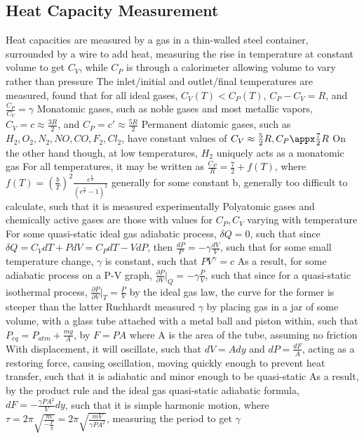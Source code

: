 \documentclass[11 pt, twoside]{article}
\newenvironment{outline*}
{
	\begin{outline}[enumerate]
	}
	{\end{outline}
}
\begin{document}
\subsection{Heat Capacity Measurement}
\begin{outline*}
\1 Heat capacities are measured by a gas in a thin-walled steel container, surrounded by a wire to add heat, measuring the rise in temperature at constant volume to get $C_V$, while $C_P$ is through a calorimeter allowing volume to vary rather than pressure
\2 The inlet/initial and outlet/final temperatures are measured, found that for all ideal gases, $C_V(T) < C_P(T)$, $C_P - C_V = R$, and $\frac{C_P}{C_V} = \gamma$
\2 Monatomic gases, such as noble gases and most metallic vapors, $C_V = c \approx \frac{3R}{2}$, and $C_P = c' \approx \frac{5R}{2}$
\2 Permanent diatomic gases, such as $H_2, O_2, N_2, NO, CO, F_2, Cl_2$, have constant values of $C_V \approx \frac{5}{2}R, C_P \appx  \frac{7}{2}R$
\3 On the other hand though, at low temperatures, $H_2$ uniquely acts as a monatomic gas
\3 For all temperatures, it may be written as $\frac{C_P}{R} = \frac{7}{2} + f(T)$, where $f(T) = (\frac{b}{T})^2 \frac{e^{\frac{b}{T}}}{(e^{\frac{b}{T}} - 1)^2}$ generally for some constant b, generally too difficult to calculate, such that it is measured experimentally
\2 Polyatomic gases and chemically active gases are those with values for $C_P, C_V$ varying with temperature
\1 For some quasi-static ideal gas adiabatic process, $\delta Q = 0$, such that since $\delta Q = C_VdT + PdV = C_PdT - VdP$, then $\frac{dP}{P} = -\gamma \frac{dV}{V}$, such that for some small temperature change, $\gamma$ is constant, such that $PV^\gamma = c$
\2 As a result, for some adiabatic process on a P-V graph, $\frac{\partial P}{\partial V}|_Q = -\gamma \frac{P}{V}$, such that since for a quasi-static isothermal process, $\frac{\partial P}{\partial V}|_T = \frac{P}{V}$ by the ideal gas law, the curve for the former is steeper than the latter
\1 Ruchhardt measured $\gamma$ by placing gas in a jar of some volume, with a glass tube attached with a metal ball and piston within, such that $P_{eq} = P_{atm} + \frac{mg}{A}$, by $F = PA$  where A is the area of the tube, assuming no friction
\2 With displacement, it will oscillate, such that $dV = Ady$ and $dP = \frac{dF}{A}$, acting as a restoring force, causing oscillation, moving quickly enough to prevent heat transfer, such that it is adiabatic and minor enough to be quasi-static
\2 As a result, by the product rule and the ideal gas quasi-static adiabatic formula, $dF = -\frac{\gamma PA^2}{V}dy$, such that it is simple harmonic motion, where $\tau = 2\pi \sqrt{\frac{m}{-\frac{F}{y}}} = 2\pi \sqrt{\frac{mV}{\gamma PA^2}}$, measuring the period to get $\gamma$

\end{outline*}
\end{document}
